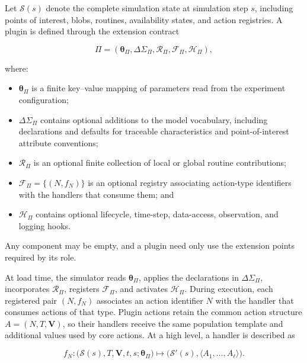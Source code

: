 Let $\mathcal{S}(s)$ denote the complete simulation state at simulation step $s$, including points of interest, blobs, routines, availability states, and action registries. 
A plugin is defined through the extension contract

\begin{equation}
\Pi=\left(\bm{\theta}_{\Pi},\Delta\Sigma_{\Pi},\mathcal{R}_{\Pi},
\mathcal{F}_{\Pi},\mathcal{H}_{\Pi}\right),
\label{eq:plugin_definition}
\end{equation}

where:
\begin{itemize}
    \item $\bm{\theta}_{\Pi}$ is a finite key--value mapping of parameters read from the experiment configuration;
    \item $\Delta\Sigma_{\Pi}$ contains optional additions to the model vocabulary, including declarations and defaults for traceable characteristics and point-of-interest attribute conventions;
    \item $\mathcal{R}_{\Pi}$ is an optional finite collection of local or global routine contributions;
    \item $\mathcal{F}_{\Pi}=\{(N,f_N)\}$ is an optional registry associating action-type identifiers with the handlers that consume them; and
    \item $\mathcal{H}_{\Pi}$ contains optional lifecycle, time-step,
    data-access, observation, and logging hooks.
\end{itemize}

Any component may be empty, and a plugin need only use the extension points required by its role. %

At load time, the simulator reads $\bm{\theta}_{\Pi}$, applies the declarations in $\Delta\Sigma_{\Pi}$, incorporates $\mathcal{R}_{\Pi}$, registers $\mathcal{F}_{\Pi}$, and activates $\mathcal{H}_{\Pi}$. 
During execution, each registered pair $(N,f_N)$ associates an action identifier $N$ with the handler that consumes actions of that type. 
Plugin actions retain the common action structure $A=(N,T,\bm{V})$, so their handlers receive the same population template and additional values used by core actions. At a high level, a handler is described as

\begin{equation}
f_N:\bigl(\mathcal{S}(s),T,\bm{V},t,s;\bm{\theta}_{\Pi}\bigr)
\longmapsto
\bigl(\mathcal{S}'(s),\langle A_1,\ldots,A_\ell\rangle\bigr).
\label{eq:plugin_action_handler}
\end{equation}

